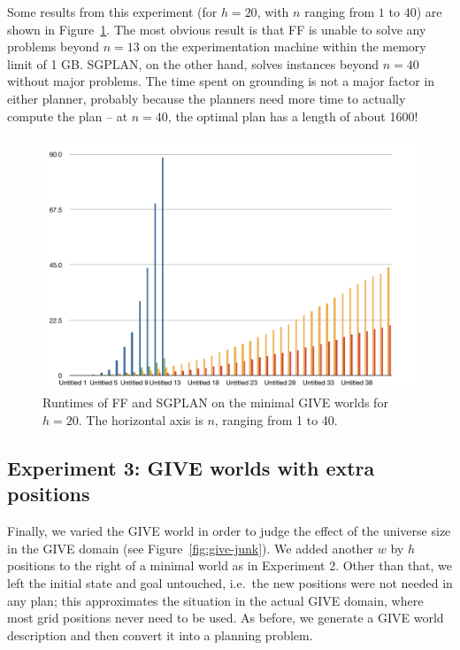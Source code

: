 Some results from this experiment (for $h=20$, with $n$ ranging from
$1$ to $40$) are shown in Figure~\ref{fig:give-runtime-minimal}.  The
most obvious result is that FF is unable to solve any problems beyond
$n=13$ on the experimentation machine within the memory limit of 1 GB.
SGPLAN, on the other hand, solves instances beyond $n=40$ without
major problems.  The time spent on grounding is not a major factor in
either planner, probably because the planners need more time to
actually compute the plan -- at $n=40$, the optimal plan has a length
of about 1600!

\begin{figure}
  \centering
  \includegraphics[width=1\columnwidth]{pic-runtime-buttons}
  \caption{Runtimes of FF and SGPLAN on the minimal GIVE worlds for $h=20$. The horizontal axis is $n$, ranging from 1 to 40.}
  \label{fig:give-runtime-minimal}
\end{figure}

\subsection{Experiment 3: GIVE worlds with extra positions}
\label{sec:experiment-3:-give}

Finally, we varied the GIVE world in order to judge the effect of the
universe size in the GIVE domain (see Figure~\ref{fig:give-junk}).  We
added another $w$ by $h$ positions to the right of a minimal world as
in Experiment 2.  Other than that, we left the initial state and goal
untouched, i.e.\ the new positions were not needed in any plan; this
approximates the situation in the actual GIVE domain, where most grid
positions never need to be used.  As before, we generate a GIVE world
description and then convert it into a planning problem.

